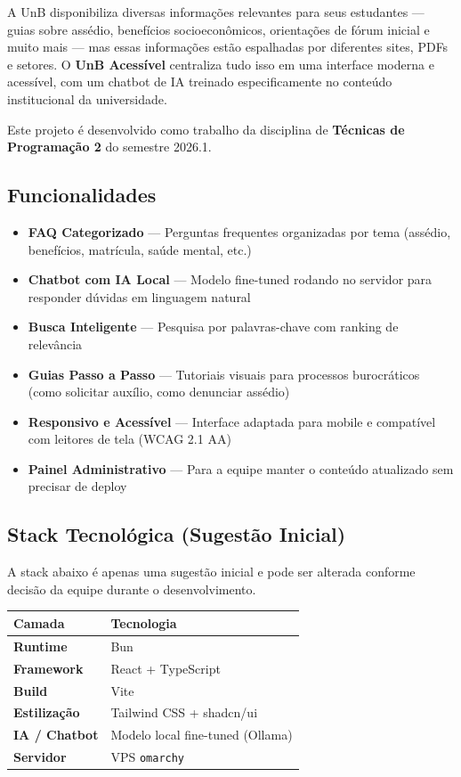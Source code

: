 \documentclass[12pt, a4paper]{article}
\begin{document}
A UnB disponibiliza diversas informações relevantes para seus estudantes — guias sobre assédio, benefícios socioeconômicos, orientações de fórum inicial e muito mais — mas essas informações estão espalhadas por diferentes sites, PDFs e setores. O \textbf{UnB Acessível} centraliza tudo isso em uma interface moderna e acessível, com um chatbot de IA treinado especificamente no conteúdo institucional da universidade.

Este projeto é desenvolvido como trabalho da disciplina de \textbf{Técnicas de Programação 2} do semestre 2026.1.

\subsection{Funcionalidades}

\begin{itemize}
  \item \textbf{FAQ Categorizado} — Perguntas frequentes organizadas por tema (assédio, benefícios, matrícula, saúde mental, etc.)
  \item \textbf{Chatbot com IA Local} — Modelo fine-tuned rodando no servidor para responder dúvidas em linguagem natural
  \item \textbf{Busca Inteligente} — Pesquisa por palavras-chave com ranking de relevância
  \item \textbf{Guias Passo a Passo} — Tutoriais visuais para processos burocráticos (como solicitar auxílio, como denunciar assédio)
  \item \textbf{Responsivo e Acessível} — Interface adaptada para mobile e compatível com leitores de tela (WCAG 2.1 AA)
  \item \textbf{Painel Administrativo} — Para a equipe manter o conteúdo atualizado sem precisar de deploy
\end{itemize}

\subsection{Stack Tecnológica (Sugestão Inicial)}

\begin{notabox}
A stack abaixo é apenas uma sugestão inicial e pode ser alterada conforme decisão da equipe durante o desenvolvimento.
\end{notabox}

\begin{center}
\begin{tabularx}{\textwidth}{>{\bfseries}l X}
  \toprule
  \rowcolor{unbgreen!10}
  Camada & Tecnologia \\
  \midrule
  Runtime & Bun \\
  Framework & React + TypeScript \\
  Build & Vite \\
  Estilização & Tailwind CSS + shadcn/ui \\
  IA / Chatbot & Modelo local fine-tuned (Ollama) \\
  Servidor & VPS \texttt{omarchy} \\
  \bottomrule
\end{tabularx}
\end{center}
\end{document}
